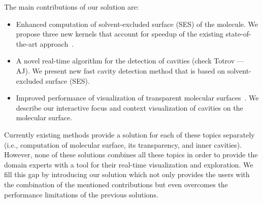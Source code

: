 The main contributions of our solution are:
\begin{itemize}
  \item Enhanced computation of solvent-excluded surface (SES) of the molecule. We propose three new kernels that account for speedup of the existing state-of-the-art approach~\cite{todo}.
  \item A novel real-time algorithm for the detection of cavities (check Totrov --- AJ). We present new fast cavity detection method that is based on solvent-excluded surface (SES).
  \item Improved performance of visualization of transparent molecular surfaces~\cite{todo}. We describe our interactive focus and context visualization of cavities on the molecular surface.
  
\end{itemize}

Currently existing methods provide a solution for each of these topics separately (i.e., computation of molecular surface, its transparency, and inner cavities).
However, none of these solutions combines all these topics in order to provide the domain experts with a tool for their real-time visualization and exploration.
We fill this gap by introducing our solution which not only provides the users with the combination of the mentioned contributions but even overcomes the performance limitations of the previous solutions.



